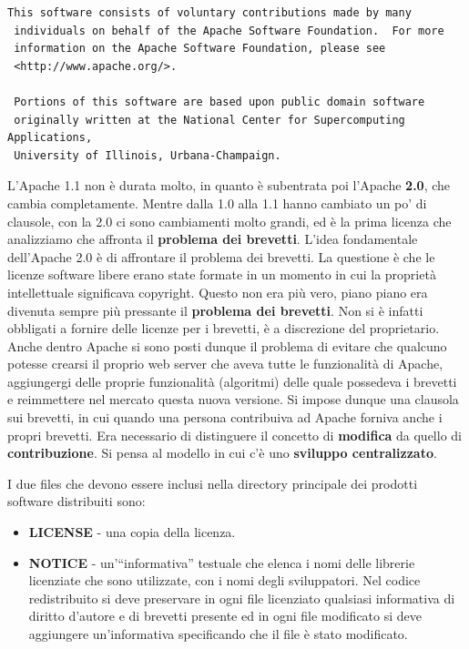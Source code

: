 \begin{lstlisting}[caption=licenza Apache 1.1]
 This software consists of voluntary contributions made by many
 individuals on behalf of the Apache Software Foundation.  For more
 information on the Apache Software Foundation, please see
 <http://www.apache.org/>.

 Portions of this software are based upon public domain software
 originally written at the National Center for Supercomputing Applications,
 University of Illinois, Urbana-Champaign.

\end{lstlisting}

\noindent L'Apache 1.1 non è durata molto, in quanto è subentrata poi l'Apache \textbf{2.0}, che cambia completamente. Mentre dalla 1.0 alla 1.1 hanno cambiato un po' di clausole, con la 2.0 ci sono cambiamenti molto grandi, ed è la prima licenza che analizziamo che affronta il \textbf{problema dei brevetti}. L'idea fondamentale dell'Apache 2.0 è di affrontare il problema dei brevetti. La questione è che le licenze software libere erano state formate in un momento in cui la proprietà intellettuale significava copyright. Questo non era più vero, piano piano era divenuta sempre più pressante il \textbf{problema dei brevetti}. Non si è infatti obbligati a fornire delle licenze per i brevetti, è a discrezione del proprietario. Anche dentro Apache si sono posti dunque il problema di evitare che qualcuno potesse crearsi il proprio web server che aveva tutte le funzionalità di Apache, aggiungergi delle proprie funzionalità (algoritmi) delle quale possedeva i brevetti e reimmettere nel mercato questa nuova versione. Si impose dunque una clausola sui brevetti, in cui quando una persona contribuiva ad Apache forniva anche i propri brevetti. Era necessario di distinguere il concetto di \textbf{modifica} da quello di \textbf{contribuzione}. Si pensa al modello in cui c'è uno \textbf{sviluppo centralizzato}.

I due files che devono essere inclusi nella directory principale dei prodotti software distribuiti sono:

\begin{itemize}

\item \textbf{LICENSE} - una copia della licenza.
\item \textbf{NOTICE} - un'``informativa'' testuale che elenca i nomi delle librerie licenziate che sono utilizzate, con i nomi degli sviluppatori. Nel codice redistribuito si deve preservare in ogni file licenziato qualsiasi informativa di diritto d'autore e di brevetti presente ed in ogni file modificato si deve aggiungere un'informativa specificando che il file è stato modificato.

\end{itemize}

